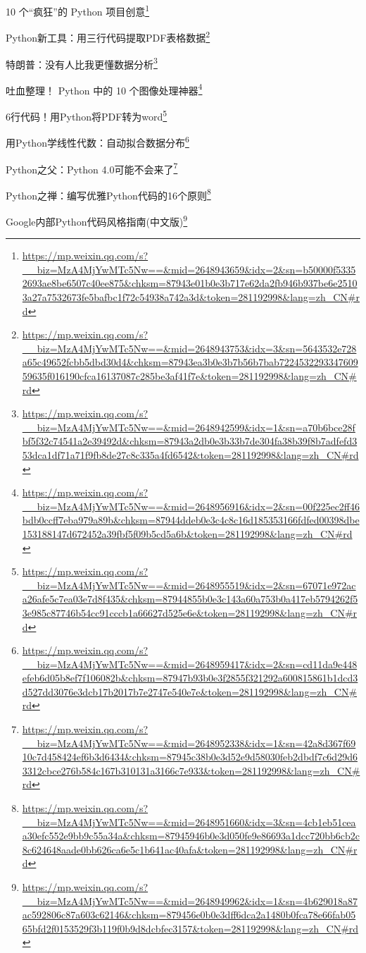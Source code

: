 \documentclass[]{ctexbook}
\renewcommand{\href}[2]{#2\footnote{\url{#1}}}
\begin{document}
\href{https://mp.weixin.qq.com/s?__biz=MzA4MjYwMTc5Nw==\&mid=2648943659\&idx=2\&sn=b50000f53352693ae8be6507c40ee875\&chksm=87943e01b0e3b717e62da2fb946b937be6e25103a27a7532673fe5bafbc1f72c54938a742a3d\&token=281192998\&lang=zh_CN\#rd}{10 个``疯狂''的 Python 项目创意}

\href{https://mp.weixin.qq.com/s?__biz=MzA4MjYwMTc5Nw==\&mid=2648943753\&idx=3\&sn=5643532e728a65c49652fcbb5dbd30d4\&chksm=87943ea3b0e3b7b56b7bab722453229334760959635f016190cfca16137087c285be3af41f7e\&token=281192998\&lang=zh_CN\#rd}{Python新工具：用三行代码提取PDF表格数据}

\href{https://mp.weixin.qq.com/s?__biz=MzA4MjYwMTc5Nw==\&mid=2648942599\&idx=1\&sn=a70b6bce28fbf5f32c74541a2e39492d\&chksm=87943a2db0e3b33b7de304fa38b39f8b7adfefd353dca1df71a71f9fb8de27c8c335a4fd6542\&token=281192998\&lang=zh_CN\#rd}{特朗普：没有人比我更懂数据分析}

\href{https://mp.weixin.qq.com/s?__biz=MzA4MjYwMTc5Nw==\&mid=2648956916\&idx=2\&sn=00f225ec2ff46bdb0ccff7eba979a89b\&chksm=87944ddeb0e3c4c8c16d185353166fdfed00398dbe153188147d672452a39fbf5f09b5cd5a6b\&token=281192998\&lang=zh_CN\#rd}{吐血整理！ Python 中的 10 个图像处理神器}

\href{https://mp.weixin.qq.com/s?__biz=MzA4MjYwMTc5Nw==\&mid=2648955519\&idx=2\&sn=67071e972aca26afe5c7ea03e7d8f435\&chksm=87944855b0e3c143a60a753b0a417eb5794262f53e985c87746b54cc91cccb1a66627d525e6e\&token=281192998\&lang=zh_CN\#rd}{6行代码！用Python将PDF转为word}

\href{https://mp.weixin.qq.com/s?__biz=MzA4MjYwMTc5Nw==\&mid=2648959417\&idx=2\&sn=cd11da9e448efeb6d05b8ef7f106082b\&chksm=87947b93b0e3f2855f321292a600815861b1dcd3d527dd3076e3dcb17b2017b7e2747e540e7e\&token=281192998\&lang=zh_CN\#rd}{用Python学线性代数：自动拟合数据分布}

\href{https://mp.weixin.qq.com/s?__biz=MzA4MjYwMTc5Nw==\&mid=2648952338\&idx=1\&sn=42a8d367f6910c7d458424ef6b3d6434\&chksm=87945c38b0e3d52e9d58030feb2dbdf7c6d29d63312cbce276b584c167b310131a3166c7e933\&token=281192998\&lang=zh_CN\#rd}{Python之父：Python 4.0可能不会来了}

\href{https://mp.weixin.qq.com/s?__biz=MzA4MjYwMTc5Nw==\&mid=2648951660\&idx=3\&sn=4cb1eb51ceaa30efc552e9bb9c55a34a\&chksm=87945946b0e3d050fe9e86693a1dcc720bb6cb2c8c624648aade0bb626ca6e5c1b641ac40afa\&token=281192998\&lang=zh_CN\#rd}{Python之禅：编写优雅Python代码的16个原则}

\href{https://mp.weixin.qq.com/s?__biz=MzA4MjYwMTc5Nw==\&mid=2648949962\&idx=1\&sn=4b629018a87ac592806c87a603c62146\&chksm=879456e0b0e3dff6dca2a1480b0fca78e66fab0565bfd2f0153529f3b119f0b9d8dcbfec3157\&token=281192998\&lang=zh_CN\#rd}{Google内部Python代码风格指南(中文版)}
\end{document}
